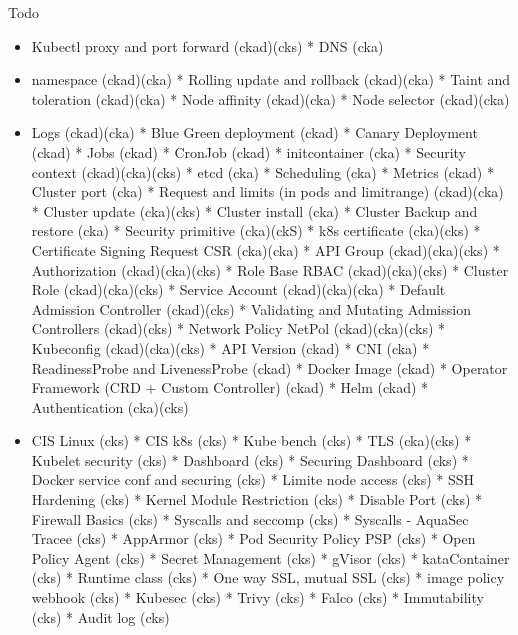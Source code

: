 \begin{frame}[fragile]{Todo}
\begin{itemize}
\item[todo] Kubectl proxy and port forward (ckad)(cks)
* DNS (cka)
\item[scheduling] namespace (ckad)(cka)
* Rolling update and rollback (ckad)(cka)
* Taint and toleration (ckad)(cka)
* Node affinity (ckad)(cka)
* Node selector (ckad)(cka)
\item[vrac] Logs (ckad)(cka)
* Blue Green deployment (ckad)
* Canary Deployment (ckad)
* Jobs (ckad)
* CronJob (ckad)
* initcontainer (cka)
* Security context (ckad)(cka)(cks)
* etcd (cka)
* Scheduling (cka)
* Metrics (ckad)
* Cluster port (cka)
* Request and limits (in pods and limitrange) (ckad)(cka)
* Cluster update (cka)(cks)
* Cluster install (cka)
* Cluster Backup and restore (cka)
* Security primitive (cka)(ckS)
* k8s certificate (cka)(cks)
* Certificate Signing Request CSR (cka)(cka)
* API Group (ckad)(cka)(cks)
* Authorization (ckad)(cka)(cks)
* Role Base RBAC (ckad)(cka)(cks)
* Cluster Role (ckad)(cka)(cks)
* Service Account (ckad)(cka)(cka)
* Default Admission Controller (ckad)(cks)
* Validating and Mutating Admission Controllers (ckad)(cks)
* Network Policy NetPol (ckad)(cka)(cks)
* Kubeconfig (ckad)(cka)(cks)
* API Version (ckad)
* CNI (cka)
* ReadinessProbe and LivenessProbe (ckad)
* Docker Image (ckad)
* Operator Framework (CRD + Custom Controller) (ckad)
* Helm (ckad)
* Authentication (cka)(cks)
\item[security] CIS Linux (cks)
* CIS k8s (cks)
* Kube bench (cks)
* TLS (cka)(cks)
* Kubelet security (cks)
* Dashboard (cks)
* Securing Dashboard (cks)
* Docker service conf and securing (cks)
* Limite node access (cks)
* SSH Hardening (cks)
* Kernel Module Restriction (cks)
* Disable Port (cks)
* Firewall Basics (cks)
* Syscalls and seccomp (cks)
* Syscalls - AquaSec Tracee (cks)
* AppArmor (cks)
* Pod Security Policy PSP (cks)
* Open Policy Agent (cks)
* Secret Management (cks)
* gVisor (cks)
* kataContainer (cks)
* Runtime class (cks)
* One way SSL, mutual SSL (cks)
* image policy webhook (cks)
* Kubesec (cks)
* Trivy (cks)
* Falco (cks)
* Immutability (cks)
* Audit log (cks)
\end{itemize}
\end{frame}
